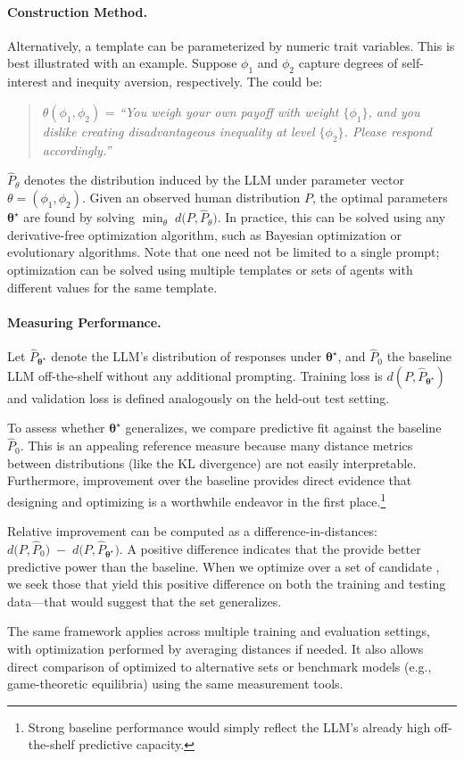 \paragraph{Construction Method.}
Alternatively, a \persona{} template can be parameterized by numeric trait variables. 
This is best illustrated with an example.
Suppose $\phi_1$ and $\phi_2$ capture degrees of self-interest and inequity aversion, respectively. 
The \persona{} could be:
\begin{quote}
\singlespacing
\vspace{-.5cm}
$\theta(\phi_1, \phi_2)$ = \emph{``You weigh your own payoff with weight $\{\phi_1\}$, and you dislike creating disadvantageous inequality at level $\{\phi_2\}$. Please respond accordingly.''}
\end{quote}
$\hat P_\theta$ denotes the distribution induced by the LLM under parameter vector $\theta = (\phi_1, \phi_2)$. 
Given an observed human distribution $P$, the optimal parameters $\bm{\theta^{\star}}$ are found by solving $\min_{\theta} \; d \bigl(P, \hat P_\theta\bigr)$.
In practice, this can be solved using any derivative-free optimization algorithm, such as Bayesian optimization or evolutionary algorithms.
Note that one need not be limited to a single prompt; optimization can be solved using multiple templates or sets of agents with different values for the same template.

\paragraph{Measuring Performance.}  
Let $\hat P_{\bm{\theta^{\star}}}$ denote the LLM's distribution of responses under $\bm{\theta^{\star}}$, and $\hat P_0$ the baseline LLM off-the-shelf without any additional prompting.
Training loss is $d(P, \hat P_{\bm{\theta^{\star}}})$ and validation loss is defined analogously on the held-out test setting. 

To assess whether $\bm{\theta^{\star}}$ generalizes, we compare predictive fit against the baseline $\hat P_0$.  
This is an appealing reference measure because many distance metrics between distributions (like the KL divergence) are not easily interpretable.
Furthermore, improvement over the baseline provides direct evidence that designing and optimizing  is a worthwhile endeavor in the first place.\footnote{Strong baseline performance would simply reflect the LLM's already high off-the-shelf predictive capacity.}

Relative improvement can be computed as a difference-in-distances: $d\bigl(P, \hat P_{0}\bigr) \;-\; d\bigl(P, \hat P_{\bm{\theta^{\star}}}\bigr)$.
A positive difference indicates that the  provide better predictive power than the baseline.
When we optimize over a set of candidate , we seek those that yield this positive difference on both the training and testing data---that would suggest that the set generalizes.

The same framework applies across multiple training and evaluation settings, with optimization performed by averaging distances if needed.  
It also allows direct comparison of optimized  to alternative \persona{} sets or benchmark models (e.g., game-theoretic equilibria) using the same measurement tools.  
